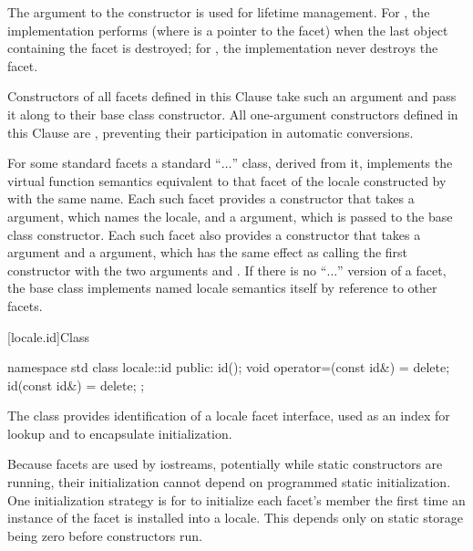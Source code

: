 \pnum
The  argument to the constructor is used for lifetime management.
For ,
the implementation performs 
(where  is a point\-er to the facet)
when the last  object containing the facet is destroyed;
for , the implementation never destroys the facet.

\pnum
Constructors of all facets defined in this Clause
take such an argument and pass it along to
their  base class constructor.
All one-argument constructors defined in this Clause are ,
preventing their participation in automatic conversions.

\pnum
For some standard facets a standard ``$\ldots$'' class,
derived from it, implements the virtual function semantics
equivalent to that facet of the locale
constructed by  with the same name.
Each such facet provides a constructor that takes
a  argument, which names the locale, and
a  argument, which is passed to the base class constructor.
Each such facet also provides a constructor that takes
a  argument  and
a  argument,
which has the same effect as calling the first constructor
with the two arguments  and .
If there is no ``$\ldots$'' version of a facet,
the base class implements named locale semantics itself
by reference to other facets.

[locale.id]{Class }

%
\begin{codeblock}
namespace std {
  class locale::id {
  public:
    id();
    void operator=(const id&) = delete;
    id(const id&) = delete;
  };
}
\end{codeblock}

\pnum
The class  provides
identification of a locale facet interface,
used as an index for lookup and to encapsulate initialization.

\pnum
\begin{note}
Because facets are used by iostreams,
potentially while static constructors are running,
their initialization cannot depend on programmed static initialization.
One initialization strategy is for 
to initialize each facet's  member
the first time an instance of the facet is installed into a locale.
This depends only on static storage being zero
before constructors run.
\end{note}

